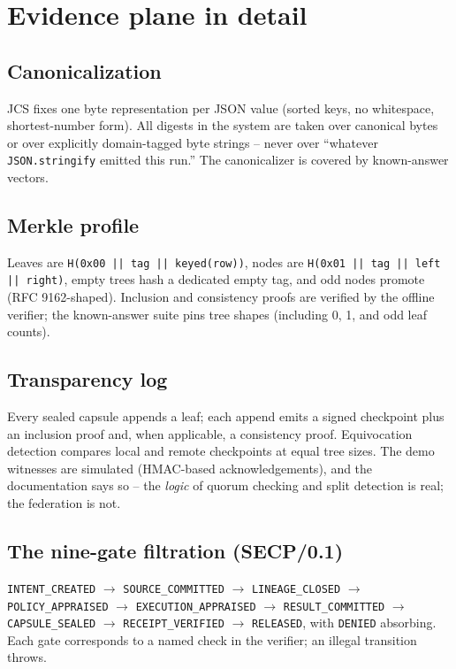 \documentclass[11pt]{article}
\newcommand{\code}[1]{\texttt{#1}}
\begin{document}
\section{Evidence plane in detail}
\label{sec:evidence}

\subsection{Canonicalization}
JCS fixes one byte representation per JSON value (sorted keys, no
whitespace, shortest-number form). All digests in the system are taken over
canonical bytes or over explicitly domain-tagged byte strings -- never over
``whatever \code{JSON.stringify} emitted this run.'' The canonicalizer is
covered by known-answer vectors.

\subsection{Merkle profile}
Leaves are \code{H(0x00 || tag || keyed(row))}, nodes are
\code{H(0x01 || tag || left || right)}, empty trees hash a dedicated empty
tag, and odd nodes promote (RFC 9162-shaped). Inclusion and consistency
proofs are verified by the offline verifier; the known-answer suite pins
tree shapes (including 0, 1, and odd leaf counts).

\subsection{Transparency log}
Every sealed capsule appends a leaf; each append emits a signed checkpoint
plus an inclusion proof and, when applicable, a consistency proof.
Equivocation detection compares local and remote checkpoints at equal tree
sizes. The demo witnesses are simulated (HMAC-based acknowledgements), and
the documentation says so -- the \emph{logic} of quorum checking and split
detection is real; the federation is not.

\subsection{The nine-gate filtration (SECP/0.1)}
\code{INTENT\_CREATED} $\rightarrow$ \code{SOURCE\_COMMITTED} $\rightarrow$
\code{LINEAGE\_CLOSED} $\rightarrow$
\code{POLICY\_APPRAISED} $\rightarrow$ \code{EXECUTION\_APPRAISED}
$\rightarrow$ \code{RESULT\_COMMITTED} $\rightarrow$
\code{CAPSULE\_SEALED} $\rightarrow$ \code{RECEIPT\_VERIFIED}
$\rightarrow$ \code{RELEASED}, with \code{DENIED} absorbing. Each gate
corresponds to a named check in the verifier; an illegal transition throws.
\end{document}
